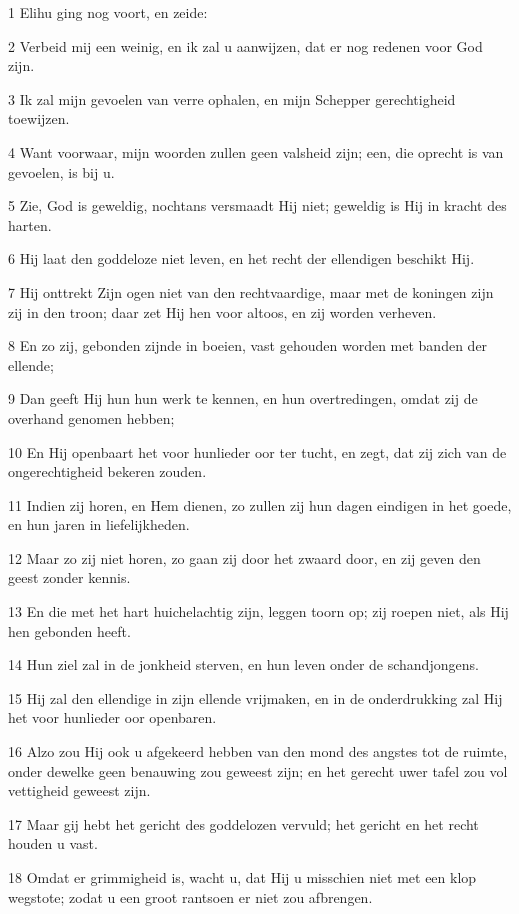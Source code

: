 \par 1 Elihu ging nog voort, en zeide:
\par 2 Verbeid mij een weinig, en ik zal u aanwijzen, dat er nog redenen voor God zijn.
\par 3 Ik zal mijn gevoelen van verre ophalen, en mijn Schepper gerechtigheid toewijzen.
\par 4 Want voorwaar, mijn woorden zullen geen valsheid zijn; een, die oprecht is van gevoelen, is bij u.
\par 5 Zie, God is geweldig, nochtans versmaadt Hij niet; geweldig is Hij in kracht des harten.
\par 6 Hij laat den goddeloze niet leven, en het recht der ellendigen beschikt Hij.
\par 7 Hij onttrekt Zijn ogen niet van den rechtvaardige, maar met de koningen zijn zij in den troon; daar zet Hij hen voor altoos, en zij worden verheven.
\par 8 En zo zij, gebonden zijnde in boeien, vast gehouden worden met banden der ellende;
\par 9 Dan geeft Hij hun hun werk te kennen, en hun overtredingen, omdat zij de overhand genomen hebben;
\par 10 En Hij openbaart het voor hunlieder oor ter tucht, en zegt, dat zij zich van de ongerechtigheid bekeren zouden.
\par 11 Indien zij horen, en Hem dienen, zo zullen zij hun dagen eindigen in het goede, en hun jaren in liefelijkheden.
\par 12 Maar zo zij niet horen, zo gaan zij door het zwaard door, en zij geven den geest zonder kennis.
\par 13 En die met het hart huichelachtig zijn, leggen toorn op; zij roepen niet, als Hij hen gebonden heeft.
\par 14 Hun ziel zal in de jonkheid sterven, en hun leven onder de schandjongens.
\par 15 Hij zal den ellendige in zijn ellende vrijmaken, en in de onderdrukking zal Hij het voor hunlieder oor openbaren.
\par 16 Alzo zou Hij ook u afgekeerd hebben van den mond des angstes tot de ruimte, onder dewelke geen benauwing zou geweest zijn; en het gerecht uwer tafel zou vol vettigheid geweest zijn.
\par 17 Maar gij hebt het gericht des goddelozen vervuld; het gericht en het recht houden u vast.
\par 18 Omdat er grimmigheid is, wacht u, dat Hij u misschien niet met een klop wegstote; zodat u een groot rantsoen er niet zou afbrengen.
